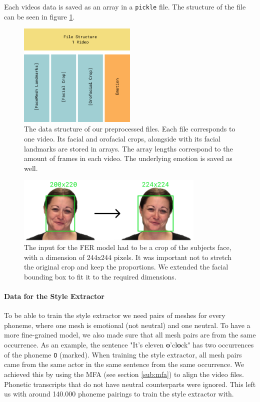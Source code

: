 Each videos data is saved as an array in a \texttt{pickle} file. The structure of the file can be seen in figure \ref{fig:pickle}.
\begin{figure}
    \centering
    \includegraphics[width=0.5\textwidth]{res/png_backup/pickle.png}
    \caption{The data structure of our preprocessed files. Each file corresponds to one video. Its facial and orofacial crops, alongside with its facial landmarks are stored in arrays. The array lengths correspond to the amount of frames in each video. The underlying emotion is saved as well.}
    \label{fig:pickle}
\end{figure}

\begin{figure}
    \centering
    \includegraphics[width=0.8\textwidth]{res/png_backup/crop.png}
    \caption{The input for the FER model had to be a crop of the subjects face, with a dimension of 244x244 pixels. It was important not to stretch the original crop and keep the proportions. We extended the facial bounding box to fit it to the required dimensions.}
    \label{fig:crop}
\end{figure}


\paragraph{Data for the Style Extractor}
To be able to train the style extractor we need pairs of meshes for every phoneme, where one mesh is emotional (not neutral) and one neutral. To have a more fine-grained model, we also made sure that all mesh pairs are from the same occurrence. As an example, the sentence "It's eleven \textbf{o}'cl\textbf{o}ck" has two occurrences of the phoneme \texttt{O} (marked). When training the style extractor, all mesh pairs came from the same actor in the same sentence from the same occurrence. We achieved this by using the MFA (see section \ref{sub:mfa}) to align the video files. Phonetic transcripts that do not have neutral counterparts were ignored. This left us with around 140.000 phoneme pairings to train the style extractor with. 


